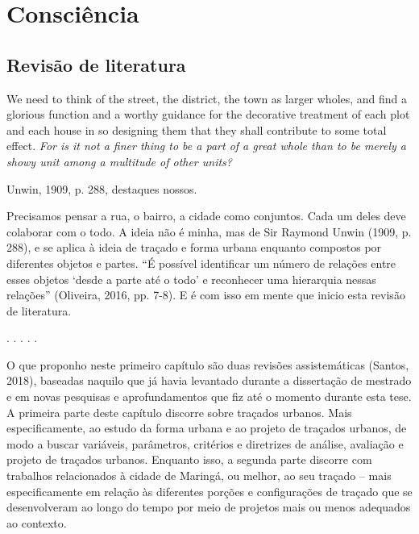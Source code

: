 \documentclass[12pt, a4paper]{book} %
\begin{document}
    
    \part[Consciência]{Consciência}

        \chapter[Revisão de literatura]{Revisão de literatura} 

        \epigraph{We need to think of the street, the district, the town as larger wholes, and find a glorious function and a worthy guidance for the decorative treatment of each plot and each house in so designing them that they shall contribute to some total effect. \textit{For is it not a finer thing to be a part of a great whole than to be merely a showy unit among a multitude of other units?}}{Unwin, 1909, p. 288, destaques nossos.}

        Precisamos pensar a rua, o bairro, a cidade como conjuntos. Cada um deles deve colaborar com o todo. A ideia não é minha, mas de Sir Raymond Unwin (1909, p. 288), e se aplica à ideia de traçado e forma urbana enquanto compostos por diferentes objetos e partes. ``É possível identificar um número de relações entre esses objetos `desde a parte até o todo' e reconhecer uma hierarquia nessas relações'' (Oliveira, 2016, pp. 7-8). E é com isso em mente que inicio esta revisão de literatura. 
        
        \begin{center}
            . . . . .
        \end{center}

        O que proponho neste primeiro capítulo são duas revisões assistemáticas (Santos, 2018), baseadas naquilo que já havia levantado durante a dissertação de mestrado e em novas pesquisas e aprofundamentos que fiz até o momento durante esta tese. A primeira parte deste capítulo discorre sobre traçados urbanos. Mais especificamente, ao estudo da forma urbana e ao projeto de traçados urbanos, de modo a buscar variáveis, parâmetros, critérios e diretrizes de análise, avaliação e projeto de traçados urbanos. Enquanto isso, a segunda parte discorre com trabalhos relacionados à cidade de Maringá, ou melhor, ao seu traçado – mais especificamente em relação às diferentes porções e configurações de traçado que se desenvolveram ao longo do tempo por meio de projetos mais ou menos adequados ao contexto.
\end{document}
